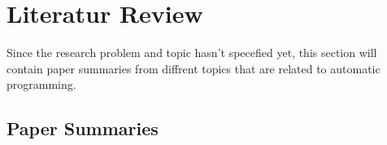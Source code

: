 \chapter{Literatur Review}
\label{c:literatur}


Since the research problem and topic hasn't specefied yet, this section will contain paper summaries from diffrent topics that are related to automatic programming.


\section{Paper Summaries}
\label{c:literatur:summaries}
